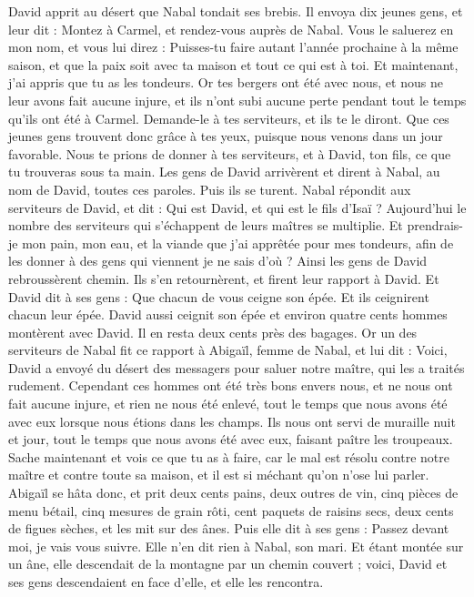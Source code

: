 \begin{multicols}{2}
David apprit au désert que Nabal tondait ses brebis.
Il envoya dix jeunes gens, et leur dit : Montez à Carmel, et rendez-vous auprès de Nabal. Vous le saluerez en mon nom,
et vous lui direz : Puisses-tu faire autant l’année prochaine à la même saison, et que la paix soit avec ta maison et tout ce qui est à toi.
Et maintenant, j'ai appris que tu as les tondeurs. Or tes bergers ont été avec nous, et nous ne leur avons fait aucune injure, et ils n’ont subi aucune perte pendant tout le temps qu'ils ont été à Carmel.
Demande-le à tes serviteurs, et ils te le diront. Que ces jeunes gens trouvent donc grâce à tes yeux, puisque nous venons dans un jour favorable. Nous te prions de donner à tes serviteurs, et à David, ton fils, ce que tu trouveras sous ta main.
Les gens de David arrivèrent et dirent à Nabal, au nom de David, toutes ces paroles. Puis ils se turent.
Nabal répondit aux serviteurs de David, et dit : Qui est David, et qui est le fils d'Isaï ? Aujourd'hui le nombre des serviteurs qui s’échappent de leurs maîtres se multiplie.
Et prendrais-je mon pain, mon eau, et la viande que j'ai apprêtée pour mes tondeurs, afin de les donner à des gens qui viennent je ne sais d'où ?
Ainsi les gens de David rebroussèrent chemin. Ils s'en retournèrent, et firent leur rapport à David.
Et David dit à ses gens : Que chacun de vous ceigne son épée. Et ils ceignirent chacun leur épée. David aussi ceignit son épée et environ quatre cents hommes montèrent avec David. Il en resta deux cents près des bagages.
Or un des serviteurs de Nabal fit ce rapport à Abigaïl, femme de Nabal, et lui dit : Voici, David a envoyé du désert des messagers pour saluer notre maître, qui les a traités rudement.
Cependant ces hommes ont été très bons envers nous, et ne nous ont fait aucune injure, et rien ne nous été enlevé, tout le temps que nous avons été avec eux lorsque nous étions dans les champs.
Ils nous ont servi de muraille nuit et jour, tout le temps que nous avons été avec eux, faisant paître les troupeaux.
Sache maintenant et vois ce que tu as à faire, car le mal est résolu contre notre maître et contre toute sa maison, et il est si méchant qu'on n'ose lui parler.
Abigaïl se hâta donc, et prit deux cents pains, deux outres de vin, cinq pièces de menu bétail, cinq mesures de grain rôti, cent paquets de raisins secs, deux cents de figues sèches, et les mit sur des ânes.
Puis elle dit à ses gens : Passez devant moi, je vais vous suivre. Elle n'en dit rien à Nabal, son mari.
Et étant montée sur un âne, elle descendait de la montagne par un chemin couvert ; voici, David et ses gens descendaient en face d’elle, et elle les rencontra.

\end{multicols}

